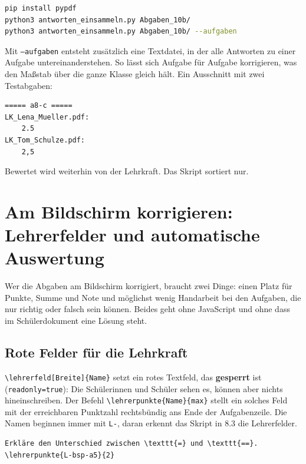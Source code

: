 \begin{Form}
\begin{lstlisting}[style=latex, language=bash]
pip install pypdf
python3 antworten_einsammeln.py Abgaben_10b/
python3 antworten_einsammeln.py Abgaben_10b/ --aufgaben
\end{lstlisting}

Mit \texttt{--aufgaben} entsteht zusätzlich eine Textdatei, in der alle
Antworten zu einer Aufgabe untereinanderstehen. So lässt sich Aufgabe für
Aufgabe korrigieren, was den Maßstab über die ganze Klasse gleich hält. Ein
Ausschnitt mit zwei Testabgaben:

\begin{lstlisting}[style=latex, language={}]
===== a8-c =====
LK_Lena_Mueller.pdf:
    2.5
LK_Tom_Schulze.pdf:
    2,5
\end{lstlisting}

Bewertet wird weiterhin von der Lehrkraft. Das Skript sortiert nur.



\section{Am Bildschirm korrigieren: Lehrerfelder und automatische Auswertung}

Wer die Abgaben am Bildschirm korrigiert, braucht zwei Dinge: einen Platz für
Punkte, Summe und Note und möglichst wenig Handarbeit bei den Aufgaben, die
nur richtig oder falsch sein können. Beides geht ohne JavaScript und ohne
dass im Schülerdokument eine Lösung steht.

\subsection{Rote Felder für die Lehrkraft}

\verb|\lehrerfeld[Breite]{Name}| setzt ein rotes Textfeld, das
\textbf{gesperrt} ist (\texttt{readonly=true}): Die Schülerinnen und Schüler
sehen es, können aber nichts hineinschreiben. Der Befehl\newline
\verb|\lehrerpunkte{Name}{max}| stellt ein solches Feld mit der erreichbaren Punktzahl rechtsbündig ans Ende
der Aufgabenzeile. Die Namen beginnen immer mit \texttt{L-}, daran erkennt
das Skript in 8.3 die Lehrerfelder.

\begin{lstlisting}[style=latex]
Erkläre den Unterschied zwischen \texttt{=} und \texttt{==}.
\lehrerpunkte{L-bsp-a5}{2}


\end{lstlisting}
\end{Form}
